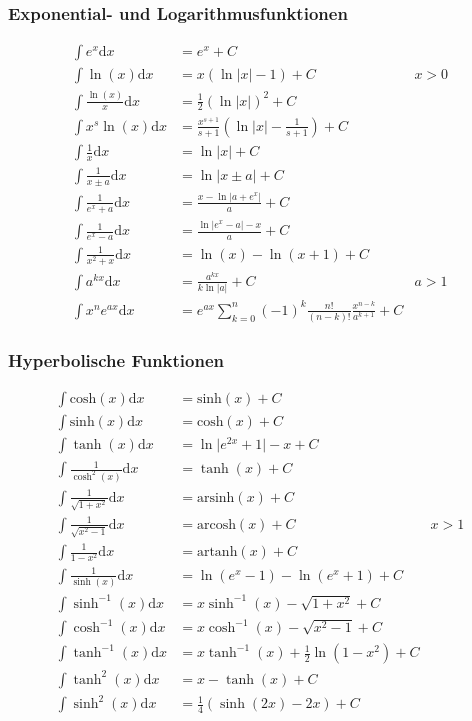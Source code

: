 \documentclass[8pt, a4paper, landscape, fleqn]{scrartcl}
\begin{document}
\begin{multicols*}{3}
				\subsubsection{Exponential- und Logarithmusfunktionen}
					\vspace{-7pt}
					\begin{align*}
					    \int e^x\text{d}x&=e^x + C\\
					    \int \ln(x)\text{d}x&=x\left(\ln\vert x \vert -1 \right)+C &x>0\\
					    \int \frac{\ln{(x)}}{x}\text{d}x&=\frac{1}{2}(\ln \vert x \vert)^2 +C\\
					    \int x^s\ln{(x)}\text{d}x&=\frac{x^{s+1}}{s+1}\left( \ln \vert x \vert-\frac{1}{s+1} \right) +C\\
					    \int \frac{1}{x}\text{d}x&=\ln\vert x \vert + C\\
					    \int \frac{1}{x\pm a}\text{d}x&=\ln \vert x\pm a \vert + C\\
					    \int \frac{1}{e^x+a}\text{d}x&=\frac{x-\ln \vert a+e^x \vert}{a} + C\\
					    \int \frac{1}{e^x-a}\text{d}x&=\frac{\ln \vert e^x-a \vert-x}{a} + C\\
					    \int \frac{1}{x^2+x}\text{d}x&=\ln(x)- \ln(x+1) + C\\
						\int a^{kx}\text{d}x&=\frac{a^{kx}}{k\ln \vert a \vert} +C &a>1\\
						\int x^ne^{ax}\text{d}x&=e^{ax}\sum_{k=0}^{n}(-1)^k \frac{n!}{(n-k)!} \frac{x^{n-k}}{a^{k+1}}+C	
					\end{align*}
				\subsubsection{Hyperbolische Funktionen}
					\vspace{-7pt}
					\begin{align*}
					    \int \text{cosh}(x)\text{d}x&=\text{sinh}(x)+C\\
					    \int \text{sinh}(x)\text{d}x&=\text{cosh}(x)+C\\
					    \int \tanh(x) \text{d}x&= \ln \vert e^{2x}+1\vert -x +C\\
					    \int \frac{1}{\cosh^2(x)}\text{d}x&=\tanh(x)+C\\
						\int \frac{1}{\sqrt{1+x^2}}\text{d}x&=\text{arsinh}(x)+C\\
						\int \frac{1}{\sqrt{x^2-1}}\text{d}x&=\text{arcosh}(x)+C &x>1\\
						\int \frac{1}{1-x^2}\text{d}x&=\text{artanh}(x)+C\\
						\int\frac{1}{\sinh{(x)}}\text{d}x&=\ln{\left(e^x-1\right)}-\ln{\left(e^x+1\right)}+C\\
						\int \sinh^{-1}{(x)}\text{d}x&=x\sinh^{-1}{(x)}-\sqrt{1+x^2}+C\\
					    \int\cosh^{-1}{(x)}\text{d}x&=x\cosh^{-1}{(x)}-\sqrt{x^2-1}+C\\
					    \int\tanh^{-1}{(x)}\text{d}x&=x\tanh^{-1}{(x)}+\frac{1}{2}\ln{(1-x^2)}+C\\
					    \int \tanh^2(x)\text{d}x&= x- \tanh(x) +C \\
    					\int \sinh^2(x)\text{d}x&= \frac{1}{4}(\sinh(2x)-2x)+C
					\end{align*}

\end{multicols*}
\end{document}
